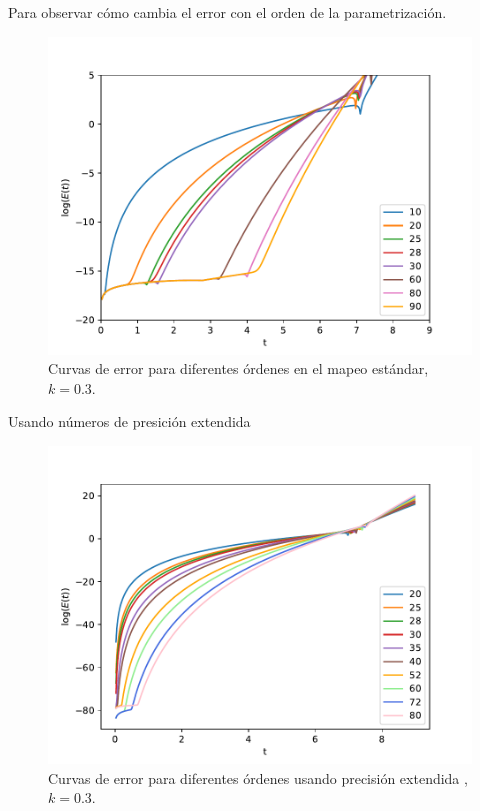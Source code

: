 \documentclass[11pt]{beamer}
\theoremstyle{definition}
\begin{document}
\begin{frame}
Para observar c\'omo cambia el error con el orden de la parametrizaci\'on.
\begin{figure}[H]
	\centering
	\includegraphics[scale=0.5]{errorf64}
	\caption{Curvas de error para diferentes órdenes en el mapeo estándar, $k=0.3$. }
	\label{erroresf64}
\end{figure}
\end{frame}

\begin{frame}
Usando n\'umeros de presici\'on extendida
\begin{figure}[H]
	\centering
	\includegraphics[scale=0.6]{errorbf}
	\caption{Curvas de error para diferentes órdenes usando precisión extendida ,$k=0.3$. }
	\label{erroresBig}
\end{figure}
\end{frame}
\end{document}
